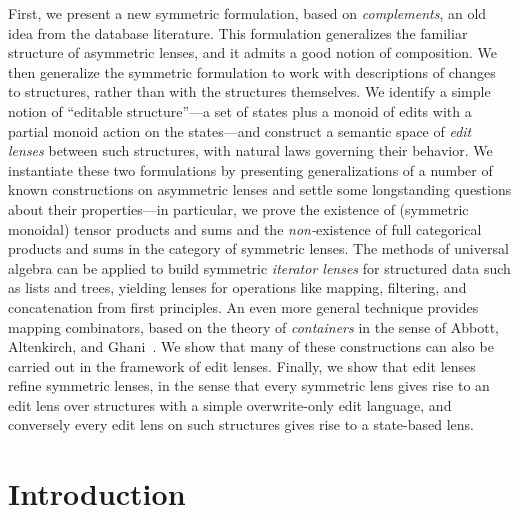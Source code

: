 \documentclass[12pt]{report}
\numberwithin{equation}{section}
\begin{document}
First, we present a new symmetric formulation, based on {\em complements},
an old idea from the database literature. This formulation generalizes the
familiar structure of asymmetric lenses, and it admits a good notion of
composition. We then generalize the symmetric formulation to work with
descriptions of changes to structures, rather than with the structures
themselves. We identify a simple notion of ``editable structure''---a set of
states plus a monoid of edits with a partial monoid action on the
states---and construct a semantic space of {\em edit lenses} between such
structures, with natural laws governing their behavior. We instantiate these
two formulations by presenting generalizations of a number of known
constructions on asymmetric lenses and settle some longstanding questions
about their properties---in particular, we prove the existence of (symmetric
monoidal) tensor products and sums and the {\em non-}existence of full
categorical products and sums in the category of symmetric lenses. The
methods of universal algebra can be applied to build symmetric {\em iterator
lenses} for structured data such as lists and trees, yielding lenses for
operations like mapping, filtering, and concatenation from first principles.
An even more general technique provides mapping combinators, based on the
theory of {\em containers} in the sense of Abbott, Altenkirch, and
Ghani~\cite{1195941}. We show that many of these constructions can also be
carried out in the framework of edit lenses. Finally, we show that edit
lenses refine symmetric lenses, in the sense that every symmetric lens gives
rise to an edit lens over structures with a simple overwrite-only edit
language, and conversely every edit lens on such structures gives rise to a
state-based lens.

\vspace*{\fill}

\newpage

\tableofcontents

\newpage

\listoftables

\listoffigures

\newpage
\singlespacing
{}

\chapter{Introduction}
\label{chap:introduction}
\label{chap:intro}


\end{document}
